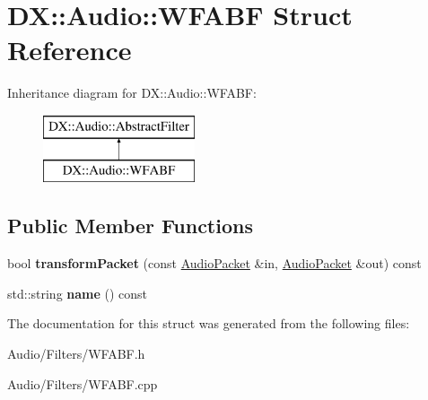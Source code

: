 \hypertarget{struct_d_x_1_1_audio_1_1_w_f_a_b_f}{\section{D\-X\-:\-:Audio\-:\-:W\-F\-A\-B\-F Struct Reference}
\label{struct_d_x_1_1_audio_1_1_w_f_a_b_f}
}
Inheritance diagram for D\-X\-:\-:Audio\-:\-:W\-F\-A\-B\-F\-:\begin{figure}[H]
\begin{center}
\leavevmode
\includegraphics[height=2.000000cm]{struct_d_x_1_1_audio_1_1_w_f_a_b_f}
\end{center}
\end{figure}
\subsection*{Public Member Functions}
\begin{DoxyCompactItemize}
\item 
\hypertarget{struct_d_x_1_1_audio_1_1_w_f_a_b_f_a5a273f168c488f5d5301f26b2672228f}{bool {\bfseries transform\-Packet} (const \hyperlink{class_d_x_1_1_audio_1_1_audio_packet}{Audio\-Packet} \&in, \hyperlink{class_d_x_1_1_audio_1_1_audio_packet}{Audio\-Packet} \&out) const }\label{struct_d_x_1_1_audio_1_1_w_f_a_b_f_a5a273f168c488f5d5301f26b2672228f}

\item 
\hypertarget{struct_d_x_1_1_audio_1_1_w_f_a_b_f_a6af060a5c93a3723cc19659e6ecde5e8}{std\-::string {\bfseries name} () const }\label{struct_d_x_1_1_audio_1_1_w_f_a_b_f_a6af060a5c93a3723cc19659e6ecde5e8}

\end{DoxyCompactItemize}


The documentation for this struct was generated from the following files\-:\begin{DoxyCompactItemize}
\item 
Audio/\-Filters/W\-F\-A\-B\-F.\-h\item 
Audio/\-Filters/W\-F\-A\-B\-F.\-cpp\end{DoxyCompactItemize}
